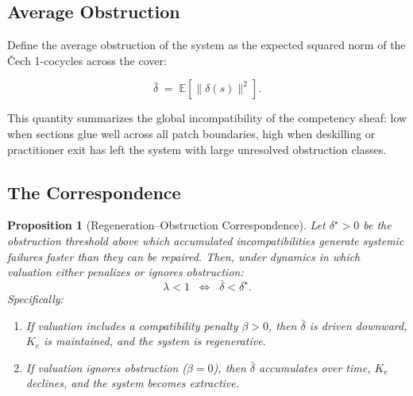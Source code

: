 \documentclass[12pt]{article}
\newtheorem{proposition}{Proposition}
\begin{document}
\subsection{Average Obstruction}

Define the average obstruction of the system as the expected squared norm of the Čech 1-cocycles across the cover:

\begin{equation}
\bar{\delta} \;=\; \mathbb{E}\!\left[\bigl\|\delta(s)\bigr\|^2\right].
\end{equation}

This quantity summarizes the global incompatibility of the competency sheaf: low when sections glue well across all patch boundaries, high when deskilling or practitioner exit has left the system with large unresolved obstruction classes.

\subsection{The Correspondence}

\begin{proposition}[Regeneration--Obstruction Correspondence]
Let $\delta^\star > 0$ be the obstruction threshold above which accumulated incompatibilities generate systemic failures faster than they can be repaired. Then, under dynamics in which valuation either penalizes or ignores obstruction:
\begin{equation}
\lambda < 1 \;\;\Longleftrightarrow\;\; \bar{\delta} < \delta^\star.
\end{equation}
Specifically:
\begin{enumerate}
\item If valuation includes a compatibility penalty $\beta > 0$, then $\bar{\delta}$ is driven downward, $K_e$ is maintained, and the system is regenerative.
\item If valuation ignores obstruction ($\beta = 0$), then $\bar{\delta}$ accumulates over time, $K_e$ declines, and the system becomes extractive.
\end{enumerate}
\end{proposition}
\end{document}
